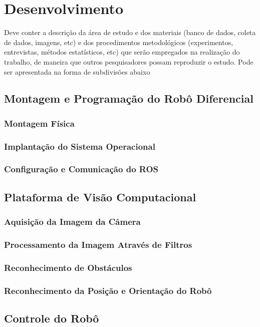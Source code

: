 \chapter{Desenvolvimento}

Deve conter a descrição da área de estudo e dos materiais (banco de dados, coleta de dados, imagens, etc) e dos procedimentos metodológicos (experimentos, entrevistas, métodos estatísticos, etc) que serão empregados na realização do trabalho, de maneira que outros pesquisadores possam reproduzir o estudo. Pode ser apresentada na forma de subdivisões abaixo

\section{Montagem e Programação do Robô Diferencial}
\subsection{Montagem Física}
\subsection{Implantação do Sistema Operacional}
\subsection{Configuração e Comunicação do ROS}

\section{Plataforma de Visão Computacional}
\subsection{Aquisição da Imagem da Câmera}
\subsection{Processamento da Imagem Através de Filtros}
\subsection{Reconhecimento de Obstáculos}
\subsection{Reconhecimento da Posição e Orientação do Robô}

\section{Controle do Robô}
